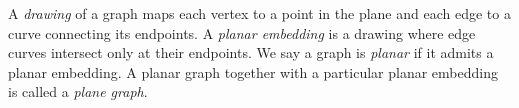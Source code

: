 \documentclass[letterpaper, 12pt]{article}
\theoremstyle{definition}
\theoremstyle{definition}
\theoremstyle{thm}
\theoremstyle{definition}
\begin{document}
\begin{comment}
\begin{figure}
\begin{tikzpicture}
	\node (a) at (0cm,0.75cm) {};
	\node (b) at (0.866cm,-0.75cm) {};
	\node (c) at (-0.866cm,-0.75cm) {};
	\node [draw=none, fill=none] (1) at (0cm,-1cm) {};
	\node [draw=none, fill=none] (2) at (0cm,1cm) {};
	\draw (a) -- (b) -- (c) -- (a);
\end{tikzpicture}
$\qquad$
\begin{tikzpicture}
	\node (a) at (0.75cm,0.75cm) {};
	\node (b) at (0.75cm,-0.75cm) {};
	\node (c) at (-0.75cm,-0.75cm) {};
	\node (d) at (-0.75cm,0.75cm) {};
	\node [draw=none, fill=none] (1) at (0cm,-1cm) {};
	\node [draw=none, fill=none] (2) at (0cm,1cm) {};
	\draw (a) -- (b) -- (c) -- (d) -- (a);
	\draw (a) -- (c); \draw (b) -- (d);
\end{tikzpicture}
$\qquad$
\begin{tikzpicture}
	\node (a) at (90:1cm) {};
	\node (b) at (162:1cm) {};
	\node (c) at (234:1cm) {};
	\node (d) at (306:1cm) {};
	\node (e) at (18:1cm) {};
	\node [draw=none, fill=none] (1) at (0cm,-1cm) {};
	\node [draw=none, fill=none] (2) at (0cm,1cm) {};
	\draw (a) -- (b); \draw (a) -- (c); \draw (a) -- (d); \draw (a) -- (e);
	\draw (b) -- (c); \draw (b) -- (d); \draw (b) -- (e); \draw (c) -- (d);
	\draw (c) -- (e); \draw (d) -- (e);
\end{tikzpicture}
$\qquad$
\begin{tikzpicture}
	\node (a) at (0.25cm,1cm) {};
	\node (b) at (-0.25cm,0.25cm) {};
	\node (c) at (0.25cm,-0.25cm) {};
	\node (d) at (-0.25cm,-1cm) {};
	\draw (a) -- (b) -- (c) -- (d);
\end{tikzpicture}
$\qquad$
\begin{tikzpicture}
	\node (a) at (180:1cm) {};
	\node (b) at (120:1cm) {};
	\node (c) at (60:1cm) {};
	\node (d) at (0:1cm) {};
	\node (e) at (300:1cm) {};
	\node (f) at (240:1cm) {};
	\node [draw=none, fill=none] (1) at (0cm,-1cm) {};
	\node [draw=none, fill=none] (2) at (0cm,1cm) {};
	\draw (a) -- (b) -- (c) -- (d) -- (e) -- (f) -- (a);
\end{tikzpicture}

\caption{Drawings of $K_3$, $K_4$, $K_5$, a length $4$ path, and a
	$5$-cycle.}
\end{figure}
\end{comment}

A \textit{drawing} of a graph maps each vertex to a point in the
plane and each edge to a curve connecting its endpoints. A \textit{planar
embedding} is a drawing where edge curves intersect only at their
endpoints. We say a graph is \textit{planar} if it admits a planar embedding. A
planar graph together with a particular planar embedding is called a
\textit{plane graph}.
\end{document}

